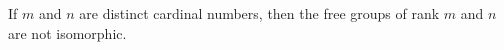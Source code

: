 If $m$ and $n$ are distinct cardinal numbers, then the free groups of rank $m$ and $n$ are not isomorphic.
